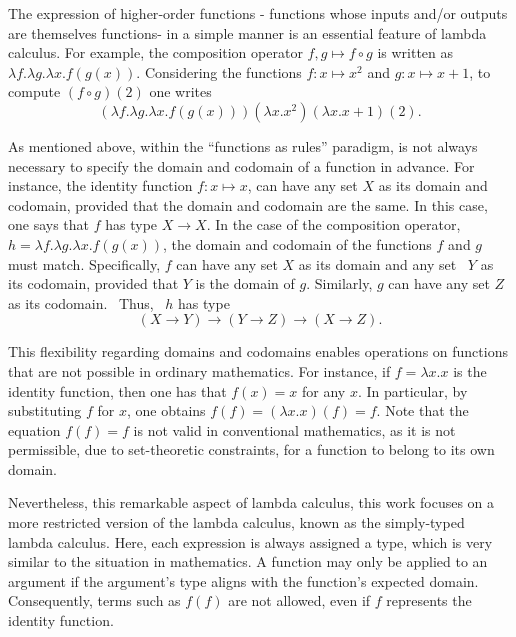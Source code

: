 The expression of higher‑order functions - functions whose inputs and/or outputs are themselves functions- in a simple manner is an essential feature of lambda calculus. For example, the composition operator $f,g \mapsto f \circ g$ is written as $\lambda f. \lambda g. \lambda x. f(g(x))$. Considering the functions $f:x \mapsto x^2$ and $g:x \mapsto x+1$, to compute $(f \circ g)(2)$ one writes $$(\lambda f. \lambda g. \lambda x. f(g(x)))(\lambda x.x^2)(\lambda x.x+1)(2).$$

As mentioned above,  within  the “functions as rules” paradigm, is not
always necessary to specify the domain and codomain of a function in advance. For instance, the identity function $f: x \mapsto x$, can have any set $X$ as its domain and codomain, provided that the domain and codomain are the same. In this case, one says that $f$ has type $X \rightarrow{} X$. In the case of the composition operator, $h=\lambda f. \lambda g. \lambda x. f(g(x))$, the domain and codomain of the functions $f$ and $g$ must match. Specifically, $f$ can have any set $X$ as its domain and any set  $Y$ as its codomain, provided that $Y$ is the domain of $g$. Similarly, $g$ can have any set $Z$ as its codomain.  Thus,  $h$ has type $$(X \rightarrow{} Y) \rightarrow{} (Y \rightarrow{} Z) \rightarrow{} (X \rightarrow{} Z).$$ 

This flexibility regarding domains and codomains enables operations on functions that are not possible in ordinary mathematics. For instance, if $f = \lambda x.x$ is the identity function, then one has that $f(x) = x$ for any $x$. In particular, by substituting $f$ for $x$, one obtains $f(f) = (\lambda x.x)(f) = f$. Note that the equation $f(f) = f$ is not valid in conventional mathematics, as it is not permissible, due to set-theoretic constraints, for a function to belong to its own domain.

Nevertheless, this remarkable aspect of lambda calculus, this work focuses on a more restricted version of the lambda calculus, known as the simply-typed lambda calculus. Here, each expression is always assigned a type, which is very similar to the situation in mathematics. A function may only be applied to an argument if the argument's type aligns with the function's expected domain. Consequently, terms such as $f(f)$ are not allowed, even if $f$ represents the identity function.






